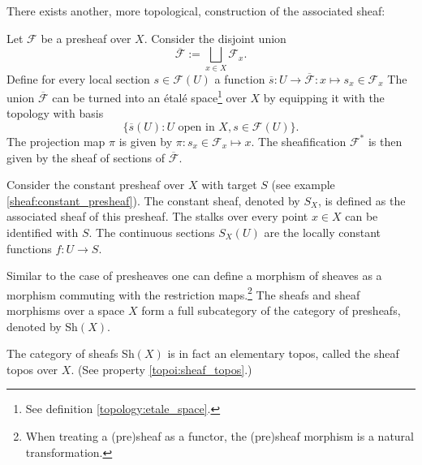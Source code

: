     There exists another, more topological, construction of the associated sheaf:
    \begin{construct}\label{sheaf:etale_construction}
        Let $\mathcal{F}$ be a presheaf over $X$. Consider the disjoint union
        \begin{equation}
            \overline{\mathcal{F}} := \bigsqcup_{x\in X}\mathcal{F}_x.
        \end{equation}
        Define for every local section $s\in\mathcal{F}(U)$ a function $\overline{s}:U\rightarrow\overline{\mathcal{F}}:x\mapsto s_x\in\mathcal{F}_x$ The union $\overline{\mathcal{F}}$ can be turned into an \'etal\'e space\footnote{See definition \ref{topology:etale_space}.} over $X$ by equipping it with the topology with basis
        \begin{equation}
            \big\{\overline{s}(U):U\text{ open in }X, s\in\mathcal{F}(U)\big\}.
        \end{equation}
        The projection map $\pi$ is given by $\pi:s_x\in\mathcal{F}_x\mapsto x$. The sheafification $\mathcal{F}^\ast$ is then given by the sheaf of sections of $\overline{\mathcal{F}}$.
    \end{construct}

    \begin{example}
        Consider the constant presheaf over $X$ with target $S$ (see example \ref{sheaf:constant_presheaf}). The constant sheaf, denoted by $S_X$, is defined as the associated sheaf of this presheaf. The stalks over every point $x\in X$ can be identified with $S$. The continuous sections $S_X(U)$ are the locally constant functions $f:U\rightarrow S$.
    \end{example}

    \begin{notation}
        Similar to the case of presheaves one can define a morphism of sheaves as a morphism commuting with the restriction maps.\footnote{When treating a (pre)sheaf as a functor, the (pre)sheaf morphism is a natural transformation.} The sheafs and sheaf morphisms over a space $X$ form a full subcategory of the category of presheafs, denoted by Sh$(X)$.
    \end{notation}

    \begin{property}
        The category of sheafs Sh$(X)$ is in fact an elementary topos, called the sheaf topos over $X$. (See property \ref{topoi:sheaf_topos}.)
    \end{property}

